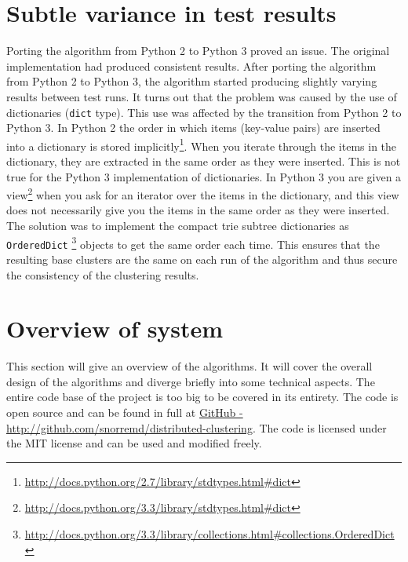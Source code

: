 \section{Subtle variance in test results}
Porting the \CTC algorithm from Python 2 to Python 3 proved an issue. The original \CTC implementation had produced consistent results. After porting the algorithm from Python 2 to Python 3, the algorithm started producing slightly varying results between test runs. It turns out that the problem was caused by the use of dictionaries (\texttt{dict} type). This use was affected by the transition from Python 2 to Python 3. In Python 2 the order in which items (key-value pairs) are inserted into a dictionary is stored implicitly\footnote{\url{http://docs.python.org/2.7/library/stdtypes.html\#dict}}. When you iterate through the items in the dictionary, they are extracted in the same order as they were inserted. This is not true for the Python 3 implementation of dictionaries. In Python 3 you are given a view\footnote{\url{http://docs.python.org/3.3/library/stdtypes.html\#dict}} when you ask for an iterator over the items in the dictionary, and this view does not necessarily give you the items in the same order as they were inserted. The solution was to implement the compact trie subtree dictionaries as \texttt{OrderedDict} \footnote{\url{http://docs.python.org/3.3/library/collections.html\#collections.OrderedDict}} objects to get the same order each time. This ensures that the resulting base clusters are the same on each run of the algorithm and thus secure the consistency of the clustering results.

\section{Overview of system}
This section will give an overview of the algorithms. It will cover the overall design of the algorithms and diverge briefly into some technical aspects. The entire code base of the project is too big to be covered in its entirety. The code is open source and can be found in full at \href{http://github.com/snorremd/distributed-clustering}{GitHub - http://github.com/snorremd/distributed-clustering}. The code is licensed under the MIT license and can be used and modified freely.

